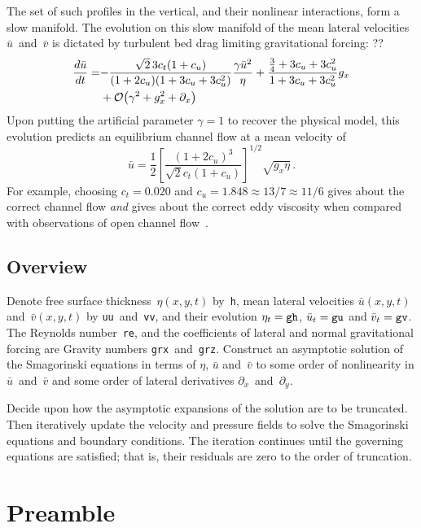 \documentclass[12pt,a5paper]{article}
\newcommand{\uu}{{\bar u}}
\newcommand{\vv}{{\bar v}}
\begin{document}
The set of such profiles in the vertical, and their nonlinear interactions, form a slow manifold.
The evolution on this slow manifold of the mean lateral velocities $\uu$~and~$\vv$ is dictated by turbulent bed drag limiting gravitational forcing:  ??
\begin{align}
\frac{d\uu}{dt}=& { 
-\frac{\sqrt2\,3c_t(1+c_u)}{(1+2c_u)(1+3c_u+3c_u^2)} }
\frac{\gamma \uu^2}\eta
+\frac{\rat34+3c_u+3c_u^2}{1+3c_u+3c_u^2}g_x
\nonumber\\&{}
+\Ord{\gamma^2+g_x^2+\partial_x}
\label{eq:gux}
\end{align}
Upon putting the artificial parameter $\gamma=1$ to recover the physical model, this evolution predicts an equilibrium channel flow at a mean velocity of
\begin{equation}
\uu=\frac12\left[ \frac{(1+2c_u)^3}
{\sqrt2c_t(1+c_u)} \right]^{1/2}\sqrt{g_x\eta} \,.
\end{equation}
For example, choosing $c_t=0.020$ and $c_u=1.848\approx 13/7\approx 11/6$ gives about the correct channel flow \emph{and} gives about the correct eddy viscosity when compared with observations of open channel flow~\cite[e.g.]{Nezu05}.



\subsection{Overview}

Denote free surface thickness~$\eta(x,y,t)$ by~\verb|h|, mean lateral velocities $\uu(x,y,t)$ and~$\vv(x,y,t)$ by \verb|uu|~and~\verb|vv|, and their
evolution $\eta_t=\verb|gh|$, $\uu_t=\verb|gu|$ and  $\vv_t=\verb|gv|$.  The Reynolds
number~\verb|re|, and the coefficients of lateral and normal
gravitational forcing are Gravity numbers \verb|grx|~and~\verb|grz|.  Construct an
asymptotic solution of the Smagorinski equations in terms of
$\eta$, $\uu$ and~$\vv$ to some order of nonlinearity in $\uu$~and~$\vv$ and some order
of lateral derivatives $\partial_x$~and~$\partial_y$.

Decide upon how the asymptotic expansions of the solution are to be
truncated.  Then iteratively update the velocity and pressure fields to
solve the Smagorinski equations and boundary conditions.  The
iteration continues until the governing equations are satisfied; that is, their
residuals are zero to the order of truncation.




\section{Preamble}
\end{document}
